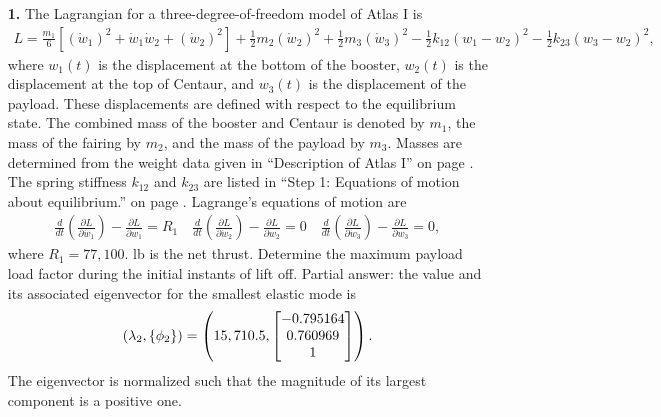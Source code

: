 \documentclass{AeroStructure-ERJohnson}
\begin{document}
\setcounter{equation}{195}

\begin{exercise}
\begin{enumerate}[\textbf{2.}]
\item[\textbf{1.}]
The Lagrangian for a three-degree-of-freedom model of Atlas I is
\begin{align}\label{eq18.196}
L=\frac{m_{1}}{6}\left[\left(\dot{w}_{1}\right)^{2}+\dot{w}_{1} \dot{w}_{2}+\left(\dot{w}_{2}\right)^{2}\right]+\frac{1}{2} m_{2}\left(\dot{w}_{2}\right)^{2}+\frac{1}{2} m_{3}\left(\dot{w}_{3}\right)^{2}-\frac{1}{2} k_{12}\left(w_{1}-w_{2}\right)^{2}-\frac{1}{2} k_{23}\left(w_{3}-w_{2}\right)^{2},
\end{align}
where $w_{1}(t)$ is the displacement at the bottom of the booster, $w_{2}(t)$ is the displacement at the top of Centaur, and $w_{3}(t)$ is the displacement of the payload. These displacements are defined with respect to the equilibrium state. The combined mass of the booster and Centaur is denoted by $m_1$, the mass of the fairing by $m_2$, and the mass of the payload by $m_3$. Masses are determined from the weight data given in ``Description of Atlas I'' on page \pageref{sec18.1}. The spring stiffness $k_{12}$ and $k_{23}$ are listed in ``Step 1: Equations of motion about equilibrium.'' on page \pageref{step1}. Lagrange's equations of motion are
\begin{align}\label{eq18.197}
\frac{d}{d t}\left(\frac{\partial L}{\partial \dot{w}_{1}}\right)-\frac{\partial L}{\partial w_{1}}=R_{1} \quad \frac{d}{d t}\left(\frac{\partial L}{\partial \dot{w}_{2}}\right)-\frac{\partial L}{\partial w_{2}}=0 \quad \frac{d}{d t}\left(\frac{\partial L}{\partial \dot{w}_{3}}\right)-\frac{\partial L}{\partial w_{3}}=0,
\end{align}
where ${R}_1 = 77,100$. lb is the net thrust. Determine the maximum payload load factor during the initial instants of lift off. Partial answer: the value and its associated eigenvector for the smallest elastic mode is
\begin{align}\label{eq18.198}
\left(\lambda_{2},\left\{\phi_{2}\right\}\right)=\left(15,710.5,\left[\begin{array}{@{}c@{}}-0.795164 \\0.760969 \\1\end{array}\right]\right).
\end{align}
The eigenvector is normalized such that the magnitude of its largest component is a positive one.


\end{enumerate}
\end{exercise}
\end{document}
